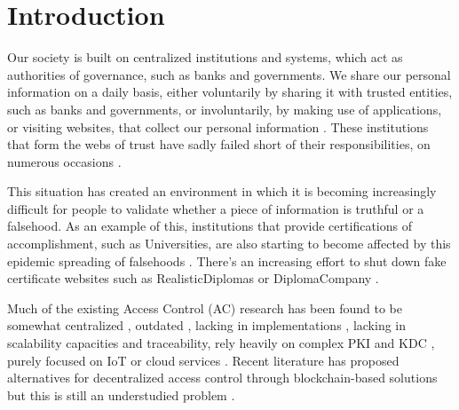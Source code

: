\section{Introduction}
\label{chap:intro}

Our society is built on centralized institutions and systems, which act as authorities of governance, such as banks and governments. We share our personal information on a daily basis, either voluntarily by sharing it with trusted entities, such as banks and governments, or involuntarily, by making use of applications, or visiting websites, that collect our personal information \cite{choi_embarrassing_2015}. These institutions that form the webs of trust have sadly failed short of their responsibilities, on numerous occasions \cite{gibbs_facebook_2014, marthews_government_2017}.

This situation has created an environment in which it is becoming increasingly difficult for people to validate whether a piece of information is truthful or a falsehood. As an example of this, institutions that provide certifications of accomplishment, such as Universities, are also starting to become affected by this epidemic spreading of falsehoods \cite{lam_how_2017}. There's an increasing effort to shut down fake certificate websites \cite{camilla_telegraph} such as RealisticDiplomas \cite{RealisticDiplomas} or DiplomaCompany \cite{DiplomaCompany}.

Much of the existing Access Control (AC) research has been found to be somewhat centralized \cite{ruj_privacy_2012, calero_toward_2010, yu_achieving_2010}, outdated \cite{satyanarayanan_integrating_1989}, lacking in implementations \cite{thomas_towards_1993}, lacking in scalability capacities \cite{miltchev_decentralized_2008} and traceability, rely heavily on complex PKI and KDC \cite{ruj_privacy_2012, ruj_decentralized_2014}, purely focused on IoT \cite{ouaddah_fairaccess:_2017, ouaddah_access_2017} or cloud services \cite{ruj_decentralized_2014, ruj_dacc:_2011}. Recent literature has proposed alternatives for decentralized access control through blockchain-based solutions but this is still an understudied problem \cite{maesa_blockchain_2017, ouaddah_fairaccess:_2017}.

